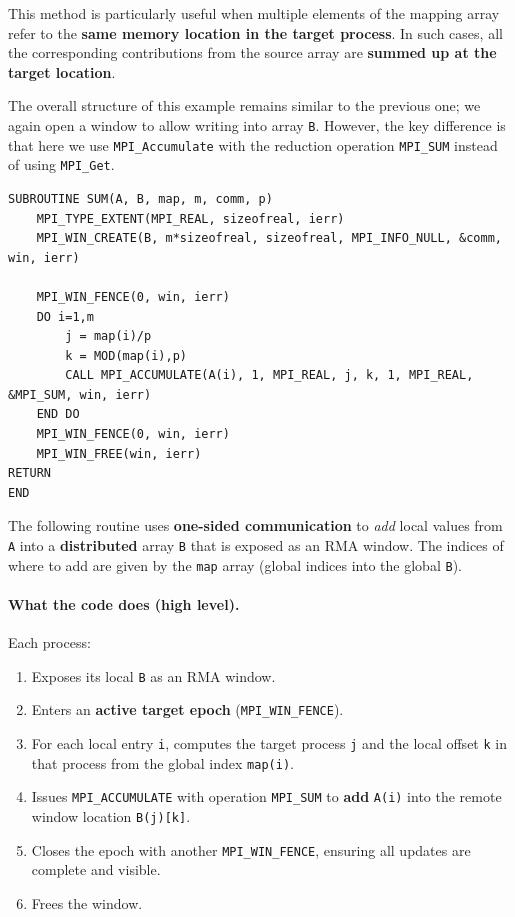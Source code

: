 \documentclass[12pt]{book}
\begin{document}
This method is particularly useful when multiple elements of the mapping array refer to the 
\textbf{same memory location in the target process}. In such cases, all the corresponding 
contributions from the source array are \textbf{summed up at the target location}.

The overall structure of this example remains similar to the previous one; we again open a 
window to allow writing into array \texttt{B}. However, the key difference is that here we 
use \texttt{MPI\_Accumulate} with the reduction operation \texttt{MPI\_SUM} instead of 
using \texttt{MPI\_Get}.

\begin{lstlisting}[style=cppstyle]
SUBROUTINE SUM(A, B, map, m, comm, p)
    MPI_TYPE_EXTENT(MPI_REAL, sizeofreal, ierr)
    MPI_WIN_CREATE(B, m*sizeofreal, sizeofreal, MPI_INFO_NULL, &comm, win, ierr)

    MPI_WIN_FENCE(0, win, ierr)
    DO i=1,m
        j = map(i)/p
        k = MOD(map(i),p)
        CALL MPI_ACCUMULATE(A(i), 1, MPI_REAL, j, k, 1, MPI_REAL, &MPI_SUM, win, ierr)
    END DO
    MPI_WIN_FENCE(0, win, ierr)
    MPI_WIN_FREE(win, ierr)
RETURN
END
\end{lstlisting}


The following routine uses \textbf{one-sided communication} to \emph{add} local values from \texttt{A} into a \textbf{distributed} array \texttt{B} that is exposed as an RMA window. The indices of where to add are given by the \texttt{map} array (global indices into the global \texttt{B}).

\paragraph{What the code does (high level).}
Each process:
\begin{enumerate}
    \item Exposes its local \texttt{B} as an RMA window.
    \item Enters an \textbf{active target epoch} (\texttt{MPI\_WIN\_FENCE}).
    \item For each local entry \texttt{i}, computes the target process \texttt{j} and the local offset \texttt{k} in that process from the global index \texttt{map(i)}.
    \item Issues \texttt{MPI\_ACCUMULATE} with operation \texttt{MPI\_SUM} to \textbf{add} \texttt{A(i)} into the remote window location \texttt{B(j)[k]}.
    \item Closes the epoch with another \texttt{MPI\_WIN\_FENCE}, ensuring all updates are complete and visible.
    \item Frees the window.
\end{enumerate}
\end{document}
